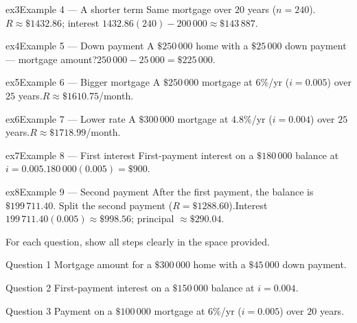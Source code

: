 \documentclass[11pt]{article}
\begin{document}
\begin{example}{ex3}{Example 4 --- A shorter term}
Same mortgage over $20$ years ($n=240$).\soln $R\approx\$1432.86$; interest $1432.86(240)-200\,000\approx\$143\,887$.
\end{example}

\begin{example}{ex4}{Example 5 --- Down payment}
A $\$250\,000$ home with a $\$25\,000$ down payment — mortgage amount?\soln $250\,000-25\,000=\$225\,000$.
\end{example}

\begin{example}{ex5}{Example 6 --- Bigger mortgage}
A $\$250\,000$ mortgage at $6\%$/yr ($i=0.005$) over $25$ years.\soln $R\approx\$1610.75$/month.
\end{example}

\begin{example}{ex6}{Example 7 --- Lower rate}
A $\$300\,000$ mortgage at $4.8\%$/yr ($i=0.004$) over $25$ years.\soln $R\approx\$1718.99$/month.
\end{example}

\begin{example}{ex7}{Example 8 --- First interest}
First-payment interest on a $\$180\,000$ balance at $i=0.005$.\soln $180\,000(0.005)=\$900$.
\end{example}

\begin{example}{ex8}{Example 9 --- Second payment}
After the first payment, the balance is $\$199\,711.40$. Split the second payment ($R=\$1288.60$).\soln Interest $199\,711.40(0.005)\approx\$998.56$; principal $\approx\$290.04$.
\end{example}

\clearpage
{}
For each question, show all steps clearly in the space provided.

\begin{qbox}{Question 1}
Mortgage amount for a $\$300\,000$ home with a $\$45\,000$ down payment.\workspace{2.4cm}
\end{qbox}

\begin{qbox}{Question 2}
First-payment interest on a $\$150\,000$ balance at $i=0.004$.\workspace{2.4cm}
\end{qbox}

\begin{qbox}{Question 3}
Payment on a $\$100\,000$ mortgage at $6\%$/yr ($i=0.005$) over $20$ years.\workspace{2.4cm}
\end{qbox}
\end{document}
